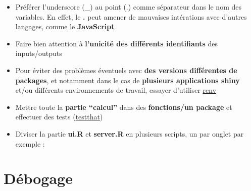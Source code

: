 \documentclass[
]{article}
\newenvironment{Shaded}{\begin{snugshade}}{\end{snugshade}}
\newcommand{\AttributeTok}[1]{\textcolor[rgb]{0.13,0.29,0.53}{#1}}
\newcommand{\CommentTok}[1]{\textcolor[rgb]{0.56,0.35,0.01}{\textit{#1}}}
\newcommand{\ConstantTok}[1]{\textcolor[rgb]{0.56,0.35,0.01}{#1}}
\newcommand{\ControlFlowTok}[1]{\textcolor[rgb]{0.13,0.29,0.53}{\textbf{#1}}}
\newcommand{\FunctionTok}[1]{\textcolor[rgb]{0.13,0.29,0.53}{\textbf{#1}}}
\newcommand{\NormalTok}[1]{#1}
\newcommand{\SpecialCharTok}[1]{\textcolor[rgb]{0.81,0.36,0.00}{\textbf{#1}}}
\newcommand{\StringTok}[1]{\textcolor[rgb]{0.31,0.60,0.02}{#1}}
\providecommand{\tightlist}{%
  \setlength{\itemsep}{0pt}\setlength{\parskip}{0pt}}
\begin{document}
\begin{itemize}
\tightlist
\item
  Préférer l'underscore (\_) au point (.) comme séparateur dans le nom
  des variables. En effet, le \textbf{.} peut amener de mauvaises
  intérations avec d'autres langages, comme le \textbf{JavaScript}
\item
  Faire bien attention à \textbf{l'unicité des différents identifiants}
  des inputs/outputs
\item
  Pour éviter des problèmes éventuels avec \textbf{des versions
  différentes de packages}, et notamment dans le cas de
  \textbf{plusieurs applications shiny} et/ou différents environnements
  de travail, essayer d'utiliser
  \href{https://rstudio.github.io/renv/articles/renv.html}{renv}
\item
  Mettre toute la \textbf{partie ``calcul''} dans des
  \textbf{fonctions/un package} et effectuer des tests
  (\href{http://r-pkgs.had.co.nz/tests.html}{testthat})
\item
  Diviser la partie \textbf{ui.R} et \textbf{server.R} en plusieurs
  scripts, un par onglet par exemple :
\end{itemize}

\begin{Shaded}
\end{Shaded}

\hypertarget{duxe9bogage}{%
\section{Débogage}\label{duxe9bogage}}
\end{document}
